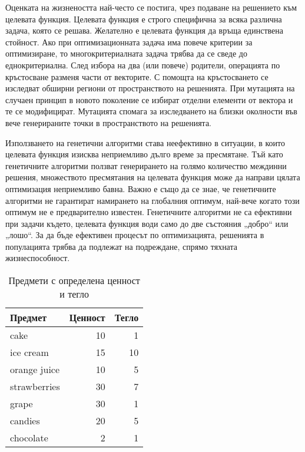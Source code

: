 Оценката на жизнеността най-често се постига, чрез подаване на решението към целевата функция. Целевата функция е строго специфична за всяка различна задача, която се решава. Желателно е целевата функция да връща единствена стойност. Ако при оптимизационната задача има повече критерии за оптимизиране, то многокритериалната задача трябва да се сведе до еднокритериална. След избора на два (или повече) родители, операцията по кръстосване разменя части от векторите. С помощта на кръстосването се изследват обширни региони от пространството на решенията. При мутацията на случаен принцип в новото поколение се избират отделни елементи от вектора и те се модифицират. Мутацията спомага за изследването на близки околности във вече генерираните точки в пространството на решенията. 

Използването на генетични алгоритми става неефективно в ситуации, в които целевата функция изисква неприемливо дълго време за пресмятане. Тъй като генетичните алгоритми ползват генерирането на голямо количество междинни решения, множеството пресмятания на целевата функция може да направи цялата оптимизация неприемливо бавна. Важно е също да се знае, че генетичните алгоритми не гарантират намирането на глобалния оптимум, най-вече когато този оптимум не е предварително известен. Генетичните алгоритми не са ефективни при задачи където, целевата функция води само до две състояния „добро“ или „лошо“. За да бъде ефективен процесът по оптимизацията, решенията в популацията трябва да подлежат на подреждане, спрямо тяхната жизнеспособност. 

\begin{table}[h!]
\centering
\begin{tabular}{|l|r|r|} 
  \rowcolor{lightgray}
  \hline
  Предмет & Ценност & Тегло \\ [0.1ex] 
  \hline\hline
  cake & 10 & 1 \\
  \hline
  ice cream & 15 & 10 \\
  \hline
  orange juice & 10 & 5 \\
  \hline
  strawberries & 30 & 7 \\
  \hline
  grape & 30 & 1 \\
  \hline
  candies & 20 & 5 \\
  \hline
  chocolate & 2 & 1 \\
  \hline
\end{tabular}
\caption{Предмети с определена ценност и тегло}
\label{table0006}
\end{table}

